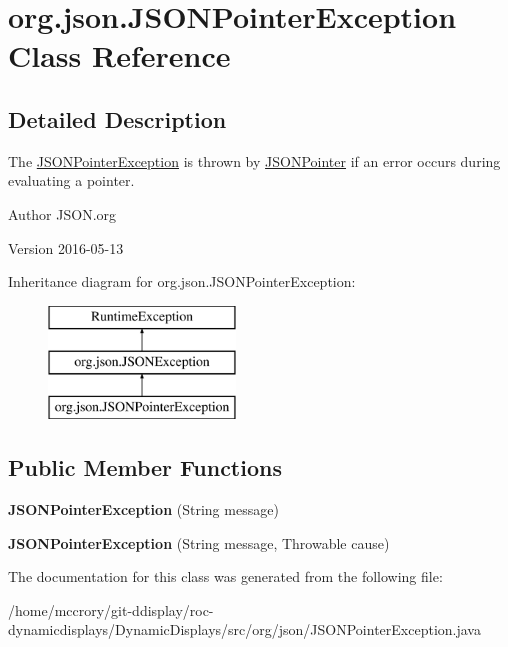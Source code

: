 \hypertarget{classorg_1_1json_1_1JSONPointerException}{\section{org.\-json.\-J\-S\-O\-N\-Pointer\-Exception Class Reference}
\label{classorg_1_1json_1_1JSONPointerException}
}


\subsection{Detailed Description}
The \hyperlink{classorg_1_1json_1_1JSONPointerException}{J\-S\-O\-N\-Pointer\-Exception} is thrown by \hyperlink{classorg_1_1json_1_1JSONPointer}{J\-S\-O\-N\-Pointer} if an error occurs during evaluating a pointer.

\begin{DoxyAuthor}{Author}
J\-S\-O\-N.\-org 
\end{DoxyAuthor}
\begin{DoxyVersion}{Version}
2016-\/05-\/13 
\end{DoxyVersion}
Inheritance diagram for org.\-json.\-J\-S\-O\-N\-Pointer\-Exception\-:\begin{figure}[H]
\begin{center}
\leavevmode
\includegraphics[height=3.000000cm]{classorg_1_1json_1_1JSONPointerException}
\end{center}
\end{figure}
\subsection*{Public Member Functions}
\begin{DoxyCompactItemize}
\item 
\hypertarget{classorg_1_1json_1_1JSONPointerException_a40c9016543b1a2a8c6acd0a26e408ae8}{{\bfseries J\-S\-O\-N\-Pointer\-Exception} (String message)}\label{classorg_1_1json_1_1JSONPointerException_a40c9016543b1a2a8c6acd0a26e408ae8}

\item 
\hypertarget{classorg_1_1json_1_1JSONPointerException_a0607a3e0ff2baa49734981af31b92c06}{{\bfseries J\-S\-O\-N\-Pointer\-Exception} (String message, Throwable cause)}\label{classorg_1_1json_1_1JSONPointerException_a0607a3e0ff2baa49734981af31b92c06}

\end{DoxyCompactItemize}


The documentation for this class was generated from the following file\-:\begin{DoxyCompactItemize}
\item 
/home/mccrory/git-\/ddisplay/roc-\/dynamicdisplays/\-Dynamic\-Displays/src/org/json/J\-S\-O\-N\-Pointer\-Exception.\-java\end{DoxyCompactItemize}
